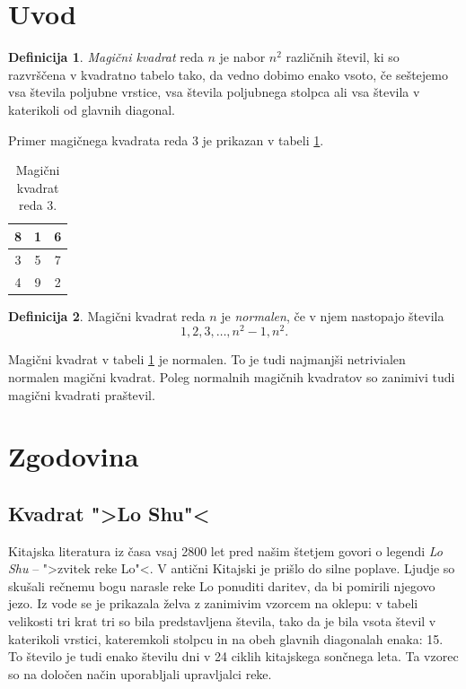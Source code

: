 \documentclass[a4paper,12pt]{article}
\theoremstyle{definition}
\newtheorem{definicija}{Definicija}
\theoremstyle{plain}
\newenvironment{magic}[3]{
   \begin{table}[h]
      \Large
      \centering
      \caption{#1}
      \label{#3}
      \begin{tabular}{|*{#2}{c|}}
         \hline
         }{
      \end{tabular}
   \end{table}
}
\newcommand{\pojem}[1]{\emph{\color{purple}#1}}
\begin{document}
\newpage

\section{Uvod}

\begin{definicija}
   \pojem{Magični kvadrat} reda $n$ je nabor $n^2$ različnih števil,
   ki so razvrščena v kvadratno tabelo tako, da vedno dobimo enako vsoto,
   če seštejemo vsa števila poljubne vrstice, vsa števila poljubnega
   stolpca ali vsa števila v katerikoli od glavnih diagonal.
\end{definicija}

Primer magičnega kvadrata reda 3 je prikazan v tabeli \ref{table:mag3}.



\begin{magic}{Magični kvadrat reda 3.}{3}{table:mag3}
   8 & 1 & 6 \\\hline
   3 & 5 & 7 \\\hline
   4 & 9 & 2 \\\hline
\end{magic}


\begin{definicija}
   Magični kvadrat reda $n$ je \pojem{normalen}, če v njem nastopajo števila
   \begin{equation}
      1, 2, 3, \ldots, n^2-1, n^2.
   \end{equation}
\end{definicija}

Magični kvadrat v tabeli \ref{table:mag3} je normalen.
To je tudi najmanjši netrivialen normalen magični kvadrat.
Poleg normalnih magičnih kvadratov so zanimivi tudi magični kvadrati praštevil.


\section{Zgodovina}

\subsection{Kvadrat ">Lo Shu"<}

Kitajska literatura iz časa vsaj 2800 let pred našim štetjem govori o legendi
\pojem{Lo Shu} -- ">zvitek reke Lo"<. V antični Kitajski je prišlo do
silne poplave. Ljudje so skušali rečnemu bogu narasle reke Lo ponuditi daritev,
da bi pomirili njegovo jezo. Iz vode se je prikazala želva z zanimivim vzorcem
na oklepu: v tabeli velikosti tri krat tri so bila predstavljena števila, tako
da je bila vsota števil v katerikoli vrstici, kateremkoli stolpcu in na obeh
glavnih diagonalah enaka: 15. To število je tudi enako številu dni v 24 ciklih
kitajskega sončnega leta. Ta vzorec so na določen način uporabljali upravljalci
reke.
\end{document}
